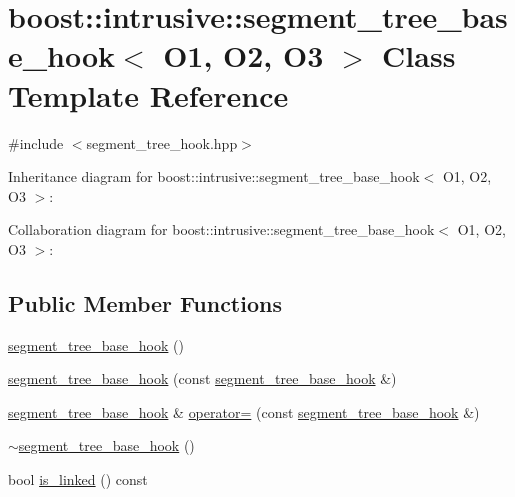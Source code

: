 \hypertarget{classboost_1_1intrusive_1_1segment__tree__base__hook}{}\section{boost\+:\+:intrusive\+:\+:segment\+\_\+tree\+\_\+base\+\_\+hook$<$ O1, O2, O3 $>$ Class Template Reference}
\label{classboost_1_1intrusive_1_1segment__tree__base__hook}


{\ttfamily \#include $<$segment\+\_\+tree\+\_\+hook.\+hpp$>$}



Inheritance diagram for boost\+:\+:intrusive\+:\+:segment\+\_\+tree\+\_\+base\+\_\+hook$<$ O1, O2, O3 $>$\+:


Collaboration diagram for boost\+:\+:intrusive\+:\+:segment\+\_\+tree\+\_\+base\+\_\+hook$<$ O1, O2, O3 $>$\+:
\subsection*{Public Member Functions}
\begin{DoxyCompactItemize}
\item 
\hyperlink{classboost_1_1intrusive_1_1segment__tree__base__hook_a05cca2dfb1187df59458f74e582dbe24}{segment\+\_\+tree\+\_\+base\+\_\+hook} ()
\item 
\hyperlink{classboost_1_1intrusive_1_1segment__tree__base__hook_a62ff8e9e17018de32ebdf3cfaefef2a4}{segment\+\_\+tree\+\_\+base\+\_\+hook} (const \hyperlink{classboost_1_1intrusive_1_1segment__tree__base__hook}{segment\+\_\+tree\+\_\+base\+\_\+hook} \&)
\item 
\hyperlink{classboost_1_1intrusive_1_1segment__tree__base__hook}{segment\+\_\+tree\+\_\+base\+\_\+hook} \& \hyperlink{classboost_1_1intrusive_1_1segment__tree__base__hook_af7ba30a6fe62f2870197836df44f1ff9}{operator=} (const \hyperlink{classboost_1_1intrusive_1_1segment__tree__base__hook}{segment\+\_\+tree\+\_\+base\+\_\+hook} \&)
\item 
\hyperlink{classboost_1_1intrusive_1_1segment__tree__base__hook_a85af62343b5a68ef5fd830dd48e4c1d1}{$\sim$segment\+\_\+tree\+\_\+base\+\_\+hook} ()
\item 
bool \hyperlink{classboost_1_1intrusive_1_1segment__tree__base__hook_aacea6fce2437d1e3a30219fe4292bbb5}{is\+\_\+linked} () const
\end{DoxyCompactItemize}


